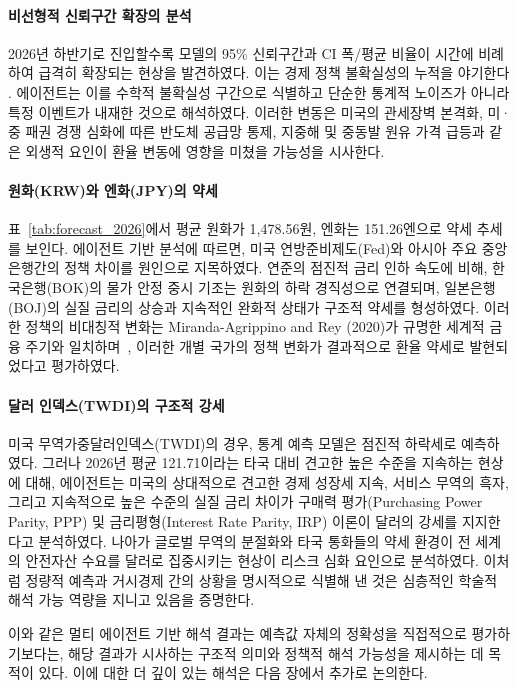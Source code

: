 \paragraph{비선형적 신뢰구간 확장의 분석}
2026년 하반기로 진입할수록 모델의 95\% 신뢰구간과 CI 폭/평균 비율이 시간에 비례하여 급격히 확장되는 현상을 발견하였다. 이는 경제 정책 불확실성의 누적을 야기한다 \cite{Baker2016}. 에이전트는 이를 수학적 불확실성 구간으로 식별하고 단순한 통계적 노이즈가 아니라 특정 이벤트가 내재한 것으로 해석하였다. 이러한 변동은 미국의 관세장벽 본격화, 미·중 패권 경쟁 심화에 따른 반도체 공급망 통제, 지중해 및 중동발 원유 가격 급등과 같은 외생적 요인이 환율 변동에 영향을 미쳤을 가능성을 시사한다\cite{Caldara2022}.

\paragraph{원화(KRW)와 엔화(JPY)의 약세}
표~\ref{tab:forecast_2026}에서 평균 원화가 1,478.56원, 엔화는 151.26엔으로 약세 추세를 보인다. 에이전트 기반 분석에 따르면, 미국 연방준비제도(Fed)와 아시아 주요 중앙은행간의 정책 차이를 원인으로 지목하였다. 연준의 점진적 금리 인하 속도에 비해, 한국은행(BOK)의 물가 안정 중시 기조는 원화의 하락 경직성으로 연결되며, 일본은행(BOJ)의 실질 금리의 상승과 지속적인 완화적 상태가 구조적 약세를 형성하였다. 이러한 정책의 비대칭적 변화는 Miranda-Agrippino and Rey (2020)가 규명한 세계적 금융 주기와 일치하며~\cite{MirandaAgrippino2020}, 이러한 개별 국가의 정책 변화가 결과적으로 환율 약세로 발현되었다고 평가하였다.

\paragraph{달러 인덱스(TWDI)의 구조적 강세}
미국 무역가중달러인덱스(TWDI)의 경우, 통계 예측 모델은 점진적 하락세로 예측하였다. 그러나 2026년 평균 121.71이라는 타국 대비 견고한 높은 수준을 지속하는 현상에 대해, 에이전트는 미국의 상대적으로 견고한 경제 성장세 지속, 서비스 무역의 흑자, 그리고 지속적으로 높은 수준의 실질 금리 차이가 구매력 평가(Purchasing Power Parity, PPP) 및 금리평형(Interest Rate Parity, IRP) 이론이 달러의 강세를 지지한다고 분석하였다. 나아가 글로벌 무역의 분절화와 타국 통화들의 약세 환경이 전 세계의 안전자산 수요를 달러로 집중시키는 현상이 리스크 심화 요인으로 분석하였다. 이처럼 정량적 예측과 거시경제 간의 상황을 명시적으로 식별해 낸 것은 심층적인 학술적 해석 가능 역량을 지니고 있음을 증명한다.

이와 같은 멀티 에이전트 기반 해석 결과는 예측값 자체의 정확성을 직접적으로 평가하기보다는, 해당 결과가 시사하는 구조적 의미와 정책적 해석 가능성을 제시하는 데 목적이 있다. 이에 대한 더 깊이 있는 해석은 다음 장에서 추가로 논의한다.
